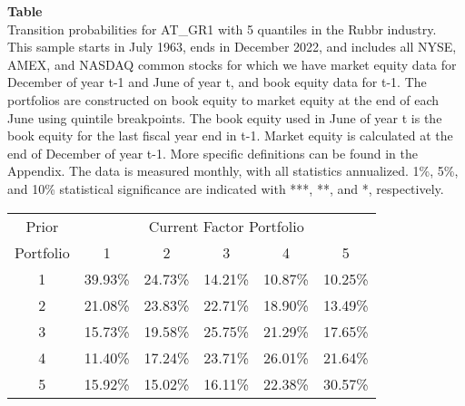 \begin{table*}[ht!]
\raggedright
{}
\label{tab: transition_probs_AT_GR1_Rubbr_with_5_quantiles}
\textbf{Table \thetable} \\
Transition probabilities for AT_GR1 with 5 quantiles in the Rubbr industry. \\
\hspace*{1em}This sample starts in July 1963, ends in December 2022, and includes all NYSE, AMEX, and NASDAQ common stocks for which we have market equity data for December of year t-1 and June of year t, and book equity data for t-1. The portfolios are constructed on book equity to market equity at the end of each June using quintile breakpoints.  The book equity used in June of year t is the book equity for the last fiscal year end in t-1.  Market equity is calculated at the end of December of year t-1.  More specific definitions can be found in the Appendix.  The data is measured monthly, with all statistics annualized.  1\%, 5\%, and 10\% statistical significance are indicated with ***, **, and *, respectively. \\
\vspace{0.5em}
\centering
\begin{adjustbox}{max width=\textwidth}
\begin{tabular}{@{}cccccc@{}}
\toprule
Prior & \multicolumn{5}{c}{Current Factor Portfolio} \\
Portfolio & 1 & 2 & 3 & 4 & 5 \\
\midrule
1 & 39.93\% & 24.73\% & 14.21\% & 10.87\% & 10.25\% \\
2 & 21.08\% & 23.83\% & 22.71\% & 18.90\% & 13.49\% \\
3 & 15.73\% & 19.58\% & 25.75\% & 21.29\% & 17.65\% \\
4 & 11.40\% & 17.24\% & 23.71\% & 26.01\% & 21.64\% \\
5 & 15.92\% & 15.02\% & 16.11\% & 22.38\% & 30.57\% \\
\bottomrule
\end{tabular}
\end{adjustbox}
\end{table*}